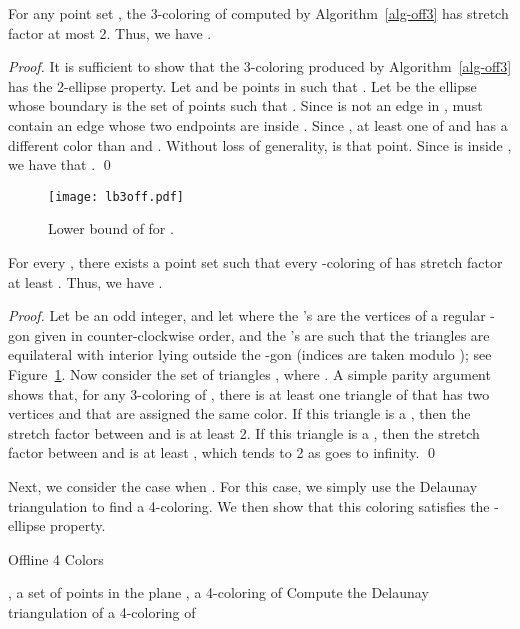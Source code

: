 \documentclass[pdftex,leqno,fleqn,12pts]{llncs}
\begin{document}
\begin{lemma}\label{prop-ub3off} 
For any point set , the 3-coloring of  computed by 
Algorithm~\ref{alg-off3} has stretch factor at most 2. Thus, we 
have .
\end{lemma}
\begin{proof}
It is sufficient to show that the 3-coloring  produced by
Algorithm~\ref{alg-off3} has the 2-ellipse property. Let  and  be 
points in  such that . Let  be the ellipse
whose boundary is the set of points  such that .
Since  is not an edge in ,  must contain an edge 
whose two endpoints are inside . Since , at least
one of  and  has a different color than  and .
Without loss of generality,  is that point. Since  is inside
, we have that .
\qed 
\end{proof}

\begin{figure}[h]
\centering\texttt{[image: lb3off.pdf]}\caption{Lower bound of
 for .}\label{fig-lb3off}
\end{figure}

\begin{lemma} 
For every , there exists a point set  such that every
-coloring of  has stretch factor at least . 
Thus, we have .
\end{lemma}
\begin{proof} 
Let  be an odd integer, and let 
 where the 's are the vertices 
of a regular -gon given in counter-clockwise order, and the 's 
are such that the triangles  are equilateral with interior lying outside the -gon
(indices are taken modulo ); see Figure~\ref{fig-lb3off}.
Now consider the set of triangles 
, where
. A simple parity argument shows
that, for any 3-coloring of , there is at least one triangle of
 that has two vertices  and  that are assigned
the same color. If this triangle is a , then the stretch factor
between  and  is at least 2. If this triangle is a , then
the stretch factor between  and  is at least
, which tends to 2 as  goes to infinity.
\qed 
\end{proof}



Next, we consider the case when . For this case, we simply use the 
Delaunay triangulation to find a 4-coloring. We then show that this 
coloring satisfies the -ellipse property.

\begin{algorithm}
\caption{Offline 4 Colors}\label{alg-off4}
\begin{algorithmic}[1]
\REQUIRE , a set of points in the plane 
\ENSURE , a 4-coloring of  
\STATE Compute the Delaunay triangulation  of  
\STATE  a 4-coloring of 
\end{algorithmic}
\end{algorithm}
\end{document}
